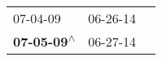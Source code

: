 \begin{supertabular}{lll}
                  07-04-09\textsuperscript{} &  06-26-14\textsuperscript{} \\
 \textbf{07-05-09\textsuperscript{$\wedge$}} &  06-27-14\textsuperscript{} \\
\end{supertabular}
